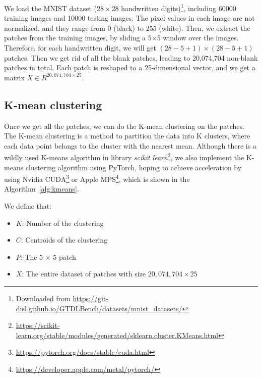 \documentclass{article}
\begin{document}
We load the MNIST dataset ($28 \times 28$ handwritten digits)\footnote{Downloaded from \url{https://git-disl.github.io/GTDLBench/datasets/mnist_datasets/}}, including 60000 training images and 10000 testing images. 
The pixel values in each image are not normalized, and they range from 0 (black) to 255 (white).
Then, we extract the patches from the training images, by sliding a 5$\times$5 window over the images.
Therefore, for each handwritten digit, we will get $(28 -5 +1) \times (28 - 5 + 1)$ patches. 
Then we get rid of all the blank patches, leading to 20,074,704 non-blank patches in total.
Each patch is reshaped to a 25-dimensional vector, and we get a matrix $X \in R^{20,074,704 \times 25}$.


\subsection{K-mean clustering}

Once we get all the patches, we can do the K-mean clustering on the patches. 
The K-mean clustering is a method to partition the data into K clusters, where each data point belongs to the cluster with the nearest mean.
Although there is a wildly used K-means algorithm in library \textit{scikit learn}\footnote{\url{https://scikit-learn.org/stable/modules/generated/sklearn.cluster.KMeans.html}}, 
we also implement the K-means clustering algorithm using PyTorch, hoping to achieve acceleration by using Nvidia CUDA\footnote{\url{https://pytorch.org/docs/stable/cuda.html}} or Apple MPS\footnote{\url{https://developer.apple.com/metal/pytorch/}}, 
which is shown in the Algorithm~\ref{alg:kmeans}.

We define that:

\begin{itemize}
    \item $K$: Number of the clustering 
    \item $C$: Centroids of the clustering
    \item $P$: The 5 $\times$ 5 patch
    \item $X$: The entire dataset of patches with size $20,074,704 \times 25$
\end{itemize}
\end{document}
